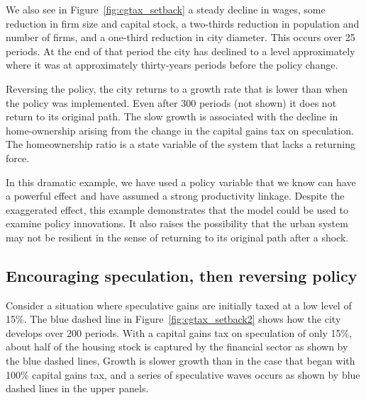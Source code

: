 We also see in Figure~\ref{fig:cgtax_setback} a steady decline in wages, some reduction in firm size and capital stock, a two-thirds reduction in population and number of firms, and a one-third reduction in city diameter. This occurs over 25 periods.  At the end of that period the city has declined to a level approximately where it was at approximately thirty-years periods before the policy change.


Reversing the policy, the city returns to a growth rate that is lower than when the policy was implemented. Even after 300 periods (not shown) it does not return to its original path. The slow growth is associated with the decline in home-ownership arising from the change in the capital gains tax on speculation. 
The homeownership ratio is a state variable of the system that lacks a returning force.

In this dramatic example, we have used a policy variable that we know can have a powerful effect and have assumed a strong productivity linkage. Despite the exaggerated effect, this example demonstrates that the model could be used to examine policy innovations. It also raises the possibility that the urban system may not be resilient in the sense of returning to its original path after a shock.



\subsection{Encouraging speculation, then reversing  policy}
Consider a situation where speculative gains are initially taxed at a low level of 15\%. The blue dashed line in Figure~\ref{fig:cgtax_setback2} shows how the city develops over 200 periods. 
With a capital gains tax on speculation of only 15\%,  about half of the housing stock is captured by the financial sector as shown by the blue dashed lines, Growth is slower growth than in the case that began with 100\% capital gains tax, and a series of speculative waves occurs as shown by blue dashed lines in the upper panels.  

